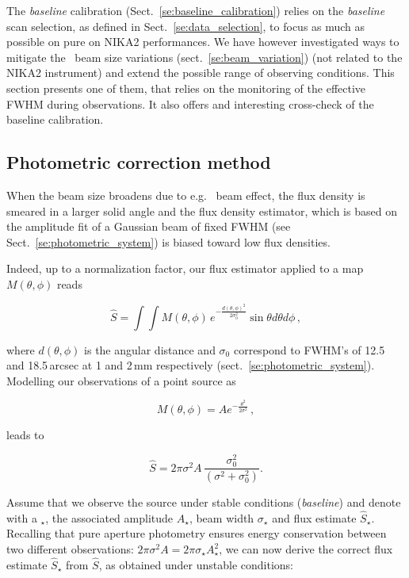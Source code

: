

The \emph{baseline} calibration (Sect.~\ref{se:baseline_calibration}) relies on
the \emph{baseline} scan selection, as defined in Sect.~\ref{se:data_selection},
to focus as much as possible on pure on NIKA2 performances. We have however
investigated ways to mitigate the \afternoon\ beam size variations
(sect.~\ref{se:beam_variation}) (not related to the NIKA2 instrument) and
extend the possible range of observing conditions. This section presents one
of them, that relies on the monitoring of the effective FWHM during
observations. It also offers and interesting cross-check of the baseline
calibration.

\subsection{Photometric correction method}
\label{se:photometric_correction_method}

When the beam size broadens due to e.g. \afternoon\ beam effect, the flux
density is smeared in a larger solid angle and the flux density estimator, which
is based on the amplitude fit of a Gaussian beam of fixed FWHM (see
Sect.~\ref{se:photometric_system}) is biased toward low flux densities.

Indeed, up to a normalization factor, our flux estimator applied to a map
$M(\theta,\phi)$ reads

\begin{equation}
  \hat{S}  = \int \int M(\theta, \phi)\, e^{-\frac{d(\theta,\phi)^{2}}{2\sigma_{0}^{2}}} \sin \theta d\theta d\phi\,,
  \label{eq:flux_density_estimator}
\end{equation}

where $d(\theta,\phi)$ is the angular distance and $\sigma_0$ correspond to
FWHM's of 12.5 and 18.5\,arcsec at 1 and 2\,mm respectively
(sect.~\ref{se:photometric_system}). Modelling our observations of a point
source as

\begin{equation}
  M(\theta, \phi) = A e^{-\frac{\theta^{2}}{2\sigma^2}}\,,
  \label{eq:pointsource_map}
\end{equation}

leads to

\begin{equation}
  \hat{S}  = 2\pi \sigma^2 A \,  \frac{\sigma_0^2}{(\sigma^2 + \sigma_0^2)}.
  \label{eq:gaussian_star}
\end{equation}

Assume that we observe the source under stable conditions (\emph{baseline}) and
denote with a $_\star$, the associated amplitude $A_\star$, beam width
$\sigma_\star$ and flux estimate $\hat{S}_\star$. Recalling that pure aperture
photometry ensures energy conservation between two different observations:
$2\pi\sigma^2 A = 2\pi\sigma_\star A_\star^2$, we can now derive the correct
flux estimate $\hat{S}_\star$ from $\hat{S}$, as obtained under unstable conditions:

